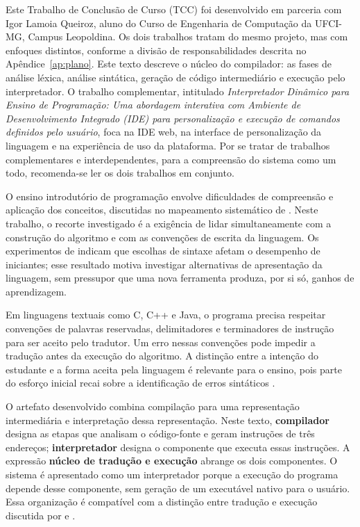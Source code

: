 \label{cap:introducao_modelo}

Este Trabalho de Conclusão de Curso (TCC) foi desenvolvido em parceria com Igor Lamoia Queiroz, aluno do Curso de Engenharia de Computação da UFCI-MG, Campus Leopoldina. Os dois trabalhos tratam do mesmo projeto, mas com enfoques distintos, conforme a divisão de responsabilidades descrita no Apêndice~\ref{ap:plano}. Este texto descreve o núcleo do compilador: as fases de análise léxica, análise sintática, geração de código intermediário e execução pelo interpretador. O trabalho complementar, intitulado \textit{Interpretador Dinâmico para Ensino de Programação: Uma abordagem interativa com Ambiente de Desenvolvimento Integrado (IDE) para personalização e execução de comandos definidos pelo usuário}, foca na IDE web, na interface de personalização da linguagem e na experiência de uso da plataforma. Por se tratar de trabalhos complementares e interdependentes, para a compreensão do sistema como um todo, recomenda-se ler os dois trabalhos em conjunto.

O ensino introdutório de programação envolve dificuldades de compreensão e aplicação dos conceitos, discutidas no mapeamento sistemático de . Neste trabalho, o recorte investigado é a exigência de lidar simultaneamente com a construção do algoritmo e com as convenções de escrita da linguagem. Os experimentos de  indicam que escolhas de sintaxe afetam o desempenho de iniciantes; esse resultado motiva investigar alternativas de apresentação da linguagem, sem pressupor que uma nova ferramenta produza, por si só, ganhos de aprendizagem.

Em linguagens textuais como C, C++ e Java, o programa precisa respeitar convenções de palavras reservadas, delimitadores e terminadores de instrução para ser aceito pelo tradutor. Um erro nessas convenções pode impedir a tradução antes da execução do algoritmo. A distinção entre a intenção do estudante e a forma aceita pela linguagem é relevante para o ensino, pois parte do esforço inicial recai sobre a identificação de erros sintáticos \cite{aho1995,stefik2013}.

O artefato desenvolvido combina compilação para uma representação intermediária e interpretação dessa representação. Neste texto, \textbf{compilador} designa as etapas que analisam o código-fonte e geram instruções de três endereços; \textbf{interpretador} designa o componente que executa essas instruções. A expressão \textbf{núcleo de tradução e execução} abrange os dois componentes. O sistema é apresentado como um interpretador porque a execução do programa depende desse componente, sem geração de um executável nativo para o usuário. Essa organização é compatível com a distinção entre tradução e execução discutida por  e .


